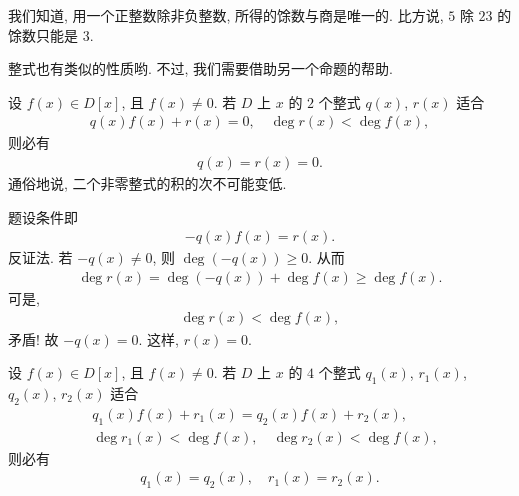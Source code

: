 我们知道, 用一个正整数除非负整数, 所得的馀数与商是唯一的. 比方说, $5$ 除 $23$ 的馀数只能是 $3$.

整式也有类似的性质哟. 不过, 我们需要借助另一个命题的帮助.

\begin{proposition}
    设 $f(x) \in D[x]$, 且 $f(x) \neq 0$. 若 $D$ 上 $x$ 的 $2$ 个整式 $q(x)$, $r(x)$ 适合
    \begin{align*}
        q(x) f(x) + r(x) = 0, \quad \deg r(x) < \deg f(x),
    \end{align*}
    则必有
    \begin{align*}
        q(x) = r(x) = 0.
    \end{align*}
    通俗地说, 二个非零整式的积的次不可能变低.
\end{proposition}

\begin{pf}
    题设条件即
    \begin{align*}
        -q(x) f(x) = r(x).
    \end{align*}
    反证法. 若 $-q(x) \neq 0$, 则 $\deg {(-q(x))} \geq 0$. 从而
    \begin{align*}
        \deg r(x) = \deg {(-q(x))} + \deg f(x) \geq \deg f(x).
    \end{align*}
    可是,
    \begin{align*}
        \deg r(x) < \deg f(x),
    \end{align*}
    矛盾! 故 $-q(x) = 0$. 这样, $r(x) = 0$.
\end{pf}

\begin{proposition}
    设 $f(x) \in D[x]$, 且 $f(x) \neq 0$. 若 $D$ 上 $x$ 的 $4$ 个整式 $q_1 (x)$, $r_1 (x)$, $q_2 (x)$, $r_2 (x)$ 适合
    \begin{align*}
         & q_1 (x) f(x) + r_1 (x) = q_2 (x) f(x) + r_2 (x),          \\
         & \deg r_1 (x) < \deg f(x), \quad \deg r_2 (x) < \deg f(x),
    \end{align*}
    则必有
    \begin{align*}
        q_1 (x) = q_2 (x), \quad r_1 (x) = r_2 (x).
    \end{align*}
\end{proposition}

